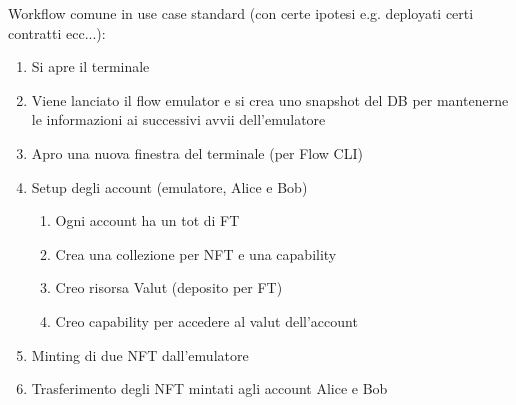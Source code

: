 Workflow comune in use case standard (con certe ipotesi e.g. deployati certi contratti ecc...):

\begin{enumerate}
    \item Si apre il terminale
    \item Viene lanciato il flow emulator e si crea uno snapshot del DB per mantenerne le informazioni ai successivi avvii dell'emulatore
    \item Apro una nuova finestra del terminale (per Flow CLI)
    \item Setup degli account (emulatore, Alice e Bob)
    \begin{enumerate}
        \item Ogni account ha un tot di FT
        \item Crea una collezione per NFT e una capability 
        \item Creo risorsa Valut (deposito per FT)
        \item Creo capability per accedere al valut dell'account
    \end{enumerate}
    \item Minting di due NFT dall'emulatore 
    \item Trasferimento degli NFT mintati agli account Alice e Bob
\end{enumerate}






